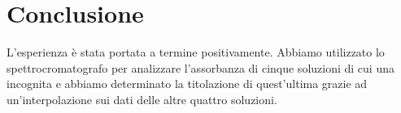 \section*{Conclusione}

L'esperienza è stata portata a termine positivamente. Abbiamo utilizzato lo spettrocromatografo per analizzare l'assorbanza di cinque soluzioni di cui una incognita e abbiamo determinato la titolazione di quest'ultima grazie ad un'interpolazione sui dati delle altre quattro soluzioni.